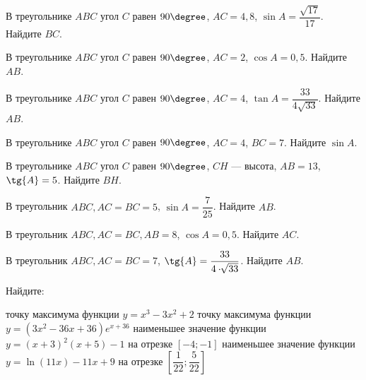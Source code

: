 \begin{class}[number=3]
	\begin{listofex}
		\item В треугольнике \(ABC\) угол \(C\) равен \(90 \degree \), \(AC=4,8\), \(\sin{A} = \dfrac{\sqrt{17}}{17}\). Найдите \(BC\).
		\item В треугольнике \(ABC\) угол \(C\) равен \(90 \degree \), \(AC=2\), \(\cos{A} = 0,5\). Найдите \(AB\).
		\item В треугольнике \(ABC\) угол \(C\) равен \(90 \degree \), \(AC=4\), \(\tan{A} = \dfrac{33}{4\sqrt{33}}\). Найдите \(AB\).
		\item В треугольнике \(ABC\) угол \(C\) равен \(90 \degree \), \(AC=4\), \(BC=7\). Найдите \(\sin{A}\).
		\item В треугольнике \(ABC\) угол \(C\) равен \(90 \degree \), \(CH\) --- высота, \(AB=13\), \(\tg{A} = 5\). Найдите \(BH\).
		\item В треугольник \(ABC, AC = BC = 5\), \( \sin{A}= \dfrac{7}{25} \). Найдите \(AB\).
		\item В треугольник \(ABC, AC = BC, AB = 8\), \( \cos{A}= 0,5 \). Найдите \(AC\).
		\item В треугольник \(ABC, AC = BC = 7\), \( \tg{A}= \dfrac{33}{4 \cdot \sqrt[]{33}} \). Найдите \(AB\).
		\item Найдите:
		\begin{itasks}[1]
			\task точку максимума функции \(y = x^3 - 3x^2 + 2\)
			\task точку максимума функции \(y = (3x^2-36x+36)e^{x+36}\)
			\task наименьшее значение функции \(y = (x+3)^2(x+5)-1\) на отрезке \([-4;-1]\)
			\task наименьшее значение функции \(y = \ln(11x)-11x+9\) на отрезке \(\left[ \dfrac{1}{22};\dfrac{5}{22} \right]\)
		\end{itasks}
	\end{listofex}
\end{class}

